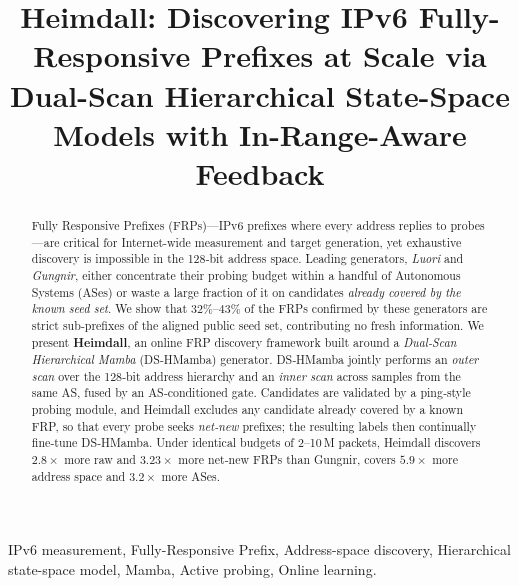 \documentclass[conference]{IEEEtran}
\begin{document}
\title{Heimdall: Discovering IPv6 Fully-Responsive Prefixes at Scale via
       Dual-Scan Hierarchical State-Space Models with In-Range-Aware
       Feedback}

\author{
}

\maketitle

\begin{abstract}
Fully Responsive Prefixes (FRPs)---IPv6 prefixes where every address replies to probes---are critical for Internet-wide measurement and target generation, yet exhaustive discovery is impossible in the 128‑bit address space. 
Leading generators, \emph{Luori} and \emph{Gungnir}, either concentrate their probing budget within a handful of Autonomous Systems (ASes) or waste a large fraction of it on candidates \emph{already covered by the known seed set}. 
We show that $32\%$--$43\%$ of the FRPs confirmed by these generators are strict sub‑prefixes of the aligned public seed set, contributing no fresh information. 
We present \textbf{Heimdall}, an online FRP discovery framework built around a \emph{Dual‑Scan Hierarchical Mamba} (DS‑HMamba) generator. 
DS‑HMamba jointly performs an \emph{outer scan} over the 128‑bit address hierarchy and an \emph{inner scan} across samples from the same AS, fused by an AS‑conditioned gate. 
Candidates are validated by a ping‑style probing module, and Heimdall excludes any candidate already covered by a known FRP, so that every probe seeks \emph{net‑new} prefixes; the resulting labels then continually fine‑tune DS‑HMamba. 
Under identical budgets of 2--10\,M packets, Heimdall discovers $\mathbf{2.8\times}$ more raw and $\mathbf{3.23\times}$ more net‑new FRPs than Gungnir, covers $\mathbf{5.9\times}$ more address space and $\mathbf{3.2\times}$ more ASes.
\end{abstract}

\begin{IEEEkeywords}
IPv6 measurement, Fully-Responsive Prefix, Address-space discovery,
Hierarchical state-space model, Mamba, Active probing, Online
learning.
\end{IEEEkeywords}
\end{document}
